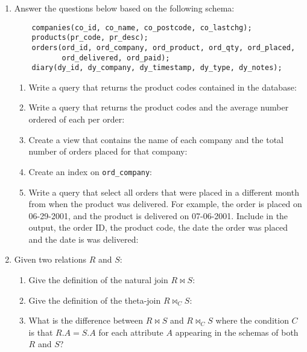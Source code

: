 {{\begin{enumerate}
\begin{enumerate}
	What is the minimum number of $R\cup S$ could have, under the
	bag semantics?
	\vspace{1in}

	What is the minimum number of $R\cup S$ could have, under 
	set semantics?
	\vspace{1in}
  \end{enumerate}

\newpage

\item Answer the questions below based on the following schema:
\begin{verbatim}
    companies(co_id, co_name, co_postcode, co_lastchg);
    products(pr_code, pr_desc);
    orders(ord_id, ord_company, ord_product, ord_qty, ord_placed, 
           ord_delivered, ord_paid);
    diary(dy_id, dy_company, dy_timestamp, dy_type, dy_notes);
\end{verbatim}
\begin{enumerate}
    \item Write a query that returns the product codes contained in the
	database:
	\vspace{1in}
    \item Write a query that returns the product codes and the average number
	ordered of each per order:
	\vspace{1in}
    \item Create a view that contains the name of each company and the 
	total number of orders placed for that company: 
	\vspace{1in}
    \item Create an index on {\tt ord\_company}:
	\vspace{1in}
    \item Write a query that select all orders that were placed in a 
	different month from when the product was delivered. For example, 
	the order is placed on 06-29-2001, and the product is delivered 
	on 07-06-2001. Include in the output, the order ID, the product code, 
	the date the order was placed and the date is was delivered:
	\vspace{1in}
\end{enumerate}

\newpage
\item Given two relations $R$ and $S$:
  \begin{enumerate}
    \item Give the definition of the natural join $R \bowtie S$:
	\vspace{.75in}
    \item Give the definition of the theta-join $R \bowtie_C S$:
	\vspace{.75in}
    \item What is the difference between $R\bowtie S$ and 
	$R \bowtie_C S$ where the condition $C$ is that $R.A = S.A$ 
	for each attribute $A$ appearing in the schemas of 
	both $R$ and $S$?
	\vspace{1in}
  \end{enumerate}


\end{enumerate}}}
